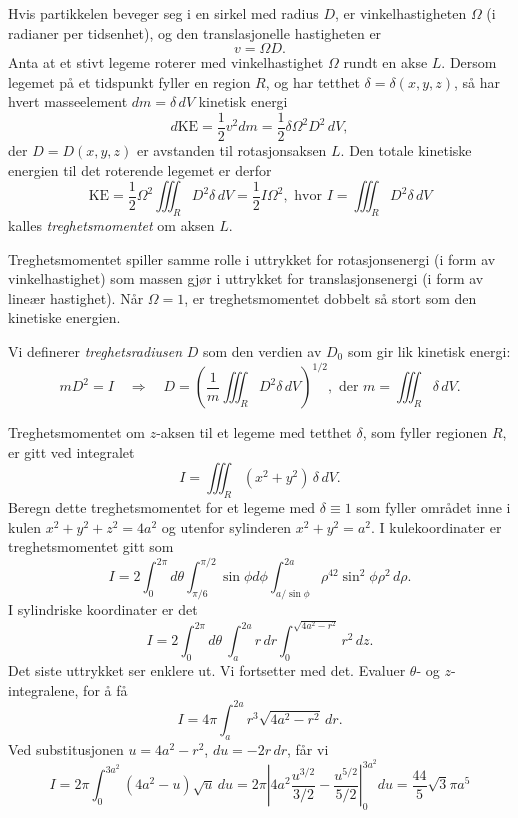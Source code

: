 Hvis partikkelen beveger seg i en sirkel med radius \( D \), er vinkelhastigheten \( \Omega \) (i radianer per tidsenhet), og den translasjonelle hastigheten er
\[
v = \Omega D.
\]
Anta at et stivt legeme roterer med vinkelhastighet \( \Omega \) rundt en akse \( L \). Dersom legemet på et tidspunkt fyller en region \( R \), og har tetthet \( \delta = \delta(x, y, z) \), så har hvert masseelement \( dm = \delta\, dV \) kinetisk energi
\[
d\text{KE} = \frac{1}{2} v^2 dm = \frac{1}{2} \delta \Omega^2 D^2\, dV,
\]
der \( D = D(x, y, z) \) er avstanden til rotasjonsaksen \( L \). Den totale kinetiske energien til det roterende legemet er derfor
\[
\text{KE} = \frac{1}{2} \Omega^2 \iiint_R D^2 \delta\, dV = \frac{1}{2} I \Omega^2,
\text{ hvor } I = \iiint_R D^2 \delta\, dV
\]
kalles \emph{treghetsmomentet} om aksen \( L \).

Treghetsmomentet spiller samme rolle i uttrykket for rotasjonsenergi (i form av vinkelhastighet) som massen gjør i uttrykket for translasjonsenergi (i form av lineær hastighet). Når \( \Omega = 1 \), er treghetsmomentet dobbelt så stort som den kinetiske energien.

Vi definerer \emph{treghetsradiusen} \( D \) som den verdien av \( D_0 \) som gir lik kinetisk energi:
\[
m D^2 = I \quad \Rightarrow \quad D = \left( \frac{1}{m} \iiint_R D^2 \delta\, dV \right)^{1/2},
\text{ der } m = \iiint_R \delta\, dV.
\]

\begin{eks}{}
Treghetsmomentet om \( z \)-aksen til et legeme med tetthet \( \delta \), som fyller regionen \( R \), er gitt ved integralet
\[
I = \iiint_R (x^2 + y^2)\, \delta\, dV.
\]
Beregn dette treghetsmomentet for et legeme med $\delta\equiv 1$ som fyller området inne i kulen \( x^2 + y^2 + z^2 = 4a^2 \) og utenfor sylinderen \( x^2 + y^2 = a^2 \).
I kulekoordinater er treghetsmomentet gitt som
\[
I = 2\int_0^{2\pi}d \theta \int_{\pi/6}^{\pi /2} \sin \phi d \phi \int_{a/\sin \phi}^{2a} \rho^42 \sin^2\phi \rho^2\, d\rho.
\]
I sylindriske koordinater er det
\[
I = 2\int_0^{2\pi} d\theta \ \int_a^{2a} r\, dr \int_0^{\sqrt{4a^2 - r^2}} r^2\, dz.
\]
Det siste uttrykket ser enklere ut. Vi fortsetter med det. Evaluer \( \theta \)- og \( z \)-integralene, for å få
\[
I = 4\pi \int_a^{2a} r^3 \sqrt{4a^2-r^2}\, dr.
\]
Ved substitusjonen \( u = 4a^2 - r^2 \), \( du = -2r\, dr \), får vi
\[
I = 2\pi \int_{0}^{3a^2} (4a^2 - u)\sqrt{u}\, du = 2\pi \left| 4a^2 \frac{u^{3/2}}{3/2} - \frac{u^{5/2}}{5/2} \right|_{0}^{3a^2} du = \frac{44}{5}\sqrt{3}\pi a^5
\]
\end{eks}

